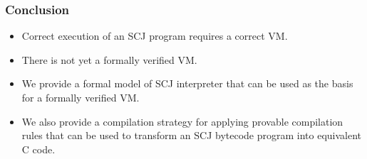 \documentclass{beamer}
\begin{document}
\begin{frame}
  \frametitle{Conclusion}
  \begin{itemize}
  \item Correct execution of an SCJ program requires a correct VM.
  \item There is not yet a formally verified VM.
  \item We provide a formal model of SCJ interpreter that can be
    used as the basis for a formally verified VM.
  \item We also provide a compilation strategy for applying provable
    compilation rules that can be used to transform an SCJ bytecode
    program into equivalent C code.
  \end{itemize}
\end{frame}
\end{document}

